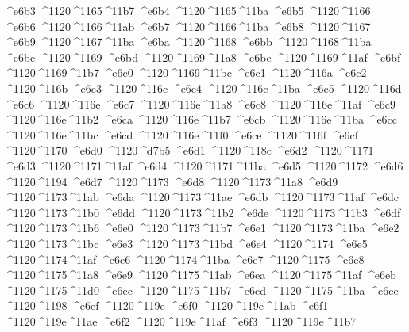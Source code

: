 \checkit ^^^^e6b3 ^^^^1120^^^^1165^^^^11b7
\checkit ^^^^e6b4 ^^^^1120^^^^1165^^^^11ba
\checkit ^^^^e6b5 ^^^^1120^^^^1166
\checkit ^^^^e6b6 ^^^^1120^^^^1166^^^^11ab
\checkit ^^^^e6b7 ^^^^1120^^^^1166^^^^11ba
\checkit ^^^^e6b8 ^^^^1120^^^^1167
\checkit ^^^^e6b9 ^^^^1120^^^^1167^^^^11ba
\checkit ^^^^e6ba ^^^^1120^^^^1168
\checkit ^^^^e6bb ^^^^1120^^^^1168^^^^11ba
\checkit ^^^^e6bc ^^^^1120^^^^1169
\checkit ^^^^e6bd ^^^^1120^^^^1169^^^^11a8
\checkit ^^^^e6be ^^^^1120^^^^1169^^^^11af
\checkit ^^^^e6bf ^^^^1120^^^^1169^^^^11b7
\checkit ^^^^e6c0 ^^^^1120^^^^1169^^^^11bc
\checkit ^^^^e6c1 ^^^^1120^^^^116a
\checkit ^^^^e6c2 ^^^^1120^^^^116b
\checkit ^^^^e6c3 ^^^^1120^^^^116c
\checkit ^^^^e6c4 ^^^^1120^^^^116c^^^^11ba
\checkit ^^^^e6c5 ^^^^1120^^^^116d
\checkit ^^^^e6c6 ^^^^1120^^^^116e
\checkit ^^^^e6c7 ^^^^1120^^^^116e^^^^11a8
\checkit ^^^^e6c8 ^^^^1120^^^^116e^^^^11af
\checkit ^^^^e6c9 ^^^^1120^^^^116e^^^^11b2
\checkit ^^^^e6ca ^^^^1120^^^^116e^^^^11b7
\checkit ^^^^e6cb ^^^^1120^^^^116e^^^^11ba
\checkit ^^^^e6cc ^^^^1120^^^^116e^^^^11bc
\checkit ^^^^e6cd ^^^^1120^^^^116e^^^^11f0
\checkit ^^^^e6ce ^^^^1120^^^^116f
\checkit ^^^^e6cf ^^^^1120^^^^1170
\checkit ^^^^e6d0 ^^^^1120^^^^d7b5
\checkit ^^^^e6d1 ^^^^1120^^^^118c
\checkit ^^^^e6d2 ^^^^1120^^^^1171
\checkit ^^^^e6d3 ^^^^1120^^^^1171^^^^11af
\checkit ^^^^e6d4 ^^^^1120^^^^1171^^^^11ba
\checkit ^^^^e6d5 ^^^^1120^^^^1172
\checkit ^^^^e6d6 ^^^^1120^^^^1194
\checkit ^^^^e6d7 ^^^^1120^^^^1173
\checkit ^^^^e6d8 ^^^^1120^^^^1173^^^^11a8
\checkit ^^^^e6d9 ^^^^1120^^^^1173^^^^11ab
\checkit ^^^^e6da ^^^^1120^^^^1173^^^^11ae
\checkit ^^^^e6db ^^^^1120^^^^1173^^^^11af
\checkit ^^^^e6dc ^^^^1120^^^^1173^^^^11b0
\checkit ^^^^e6dd ^^^^1120^^^^1173^^^^11b2
\checkit ^^^^e6de ^^^^1120^^^^1173^^^^11b3
\checkit ^^^^e6df ^^^^1120^^^^1173^^^^11b6
\checkit ^^^^e6e0 ^^^^1120^^^^1173^^^^11b7
\checkit ^^^^e6e1 ^^^^1120^^^^1173^^^^11ba
\checkit ^^^^e6e2 ^^^^1120^^^^1173^^^^11bc
\checkit ^^^^e6e3 ^^^^1120^^^^1173^^^^11bd
\checkit ^^^^e6e4 ^^^^1120^^^^1174
\checkit ^^^^e6e5 ^^^^1120^^^^1174^^^^11af
\checkit ^^^^e6e6 ^^^^1120^^^^1174^^^^11ba
\checkit ^^^^e6e7 ^^^^1120^^^^1175
\checkit ^^^^e6e8 ^^^^1120^^^^1175^^^^11a8
\checkit ^^^^e6e9 ^^^^1120^^^^1175^^^^11ab
\checkit ^^^^e6ea ^^^^1120^^^^1175^^^^11af
\checkit ^^^^e6eb ^^^^1120^^^^1175^^^^11d0
\checkit ^^^^e6ec ^^^^1120^^^^1175^^^^11b7
\checkit ^^^^e6ed ^^^^1120^^^^1175^^^^11ba
\checkit ^^^^e6ee ^^^^1120^^^^1198
\checkit ^^^^e6ef ^^^^1120^^^^119e
\checkit ^^^^e6f0 ^^^^1120^^^^119e^^^^11ab
\checkit ^^^^e6f1 ^^^^1120^^^^119e^^^^11ae
\checkit ^^^^e6f2 ^^^^1120^^^^119e^^^^11af
\checkit ^^^^e6f3 ^^^^1120^^^^119e^^^^11b7
